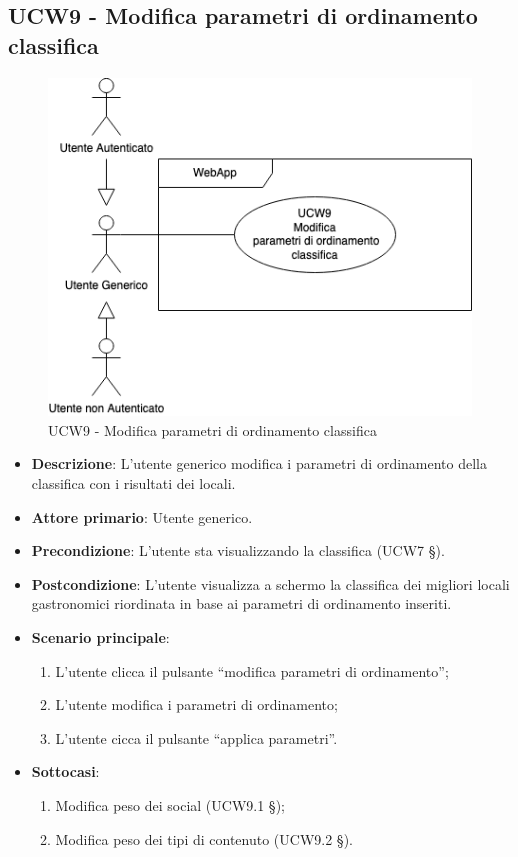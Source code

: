 \subsection{UCW9 - Modifica parametri di ordinamento classifica}
\begin{figure}[!h]
\centering
    \includegraphics[scale=0.5]{UC_images/UCW9.png}
    \caption{UCW9 - Modifica parametri di ordinamento classifica}
\end{figure}
\begin{itemize}
	\item \textbf{Descrizione}: L'utente generico modifica i parametri di ordinamento della classifica con i risultati dei locali.
    \item \textbf{Attore primario}: Utente generico.
    \item \textbf{Precondizione}: L’utente sta visualizzando la classifica (UCW7 §).
    \item \textbf{Postcondizione}: L’utente visualizza a schermo la classifica dei migliori locali gastronomici riordinata in base ai parametri di ordinamento inseriti.
    \item \textbf{Scenario principale}: 
    \begin{enumerate}
        \item L’utente clicca il pulsante “modifica parametri di ordinamento”;
        \item L’utente modifica i parametri di ordinamento;
        \item L’utente cicca il pulsante “applica parametri”.
    \end{enumerate}

    \item \textbf{Sottocasi}:
    \begin{enumerate}
        \item Modifica peso dei social (UCW9.1 §);
        \item Modifica peso dei tipi di contenuto (UCW9.2 §).
    \end{enumerate}

\end{itemize}

